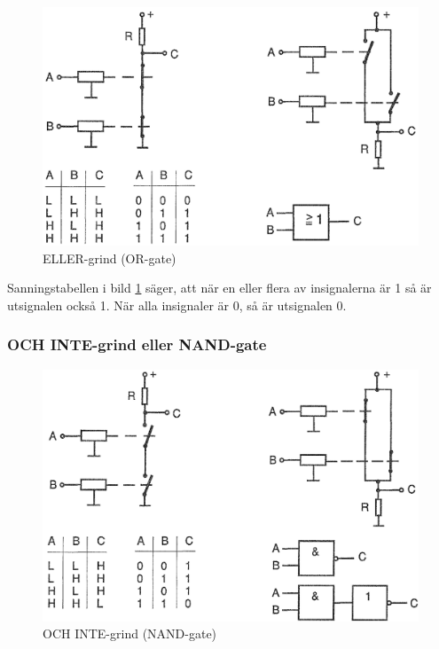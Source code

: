 \begin{figure}
\includegraphics[width=\textwidth]{images/cropped_pdfs/bild_2_2-38.pdf}
\caption{ELLER-grind (OR-gate)}
\label{fig:BildII2-38}
\end{figure}

Sanningstabellen i bild \ref{fig:BildII2-38} säger, att när en eller flera av
insignalerna är 1 så är utsignalen också 1.
När alla insignaler är 0, så är utsignalen 0.

\subsubsection{OCH INTE-grind eller NAND-gate}

\begin{figure}
\includegraphics[width=\textwidth]{images/cropped_pdfs/bild_2_2-39.pdf}
\caption{OCH INTE-grind (NAND-gate)}
\label{fig:BildII2-39}
\end{figure}

